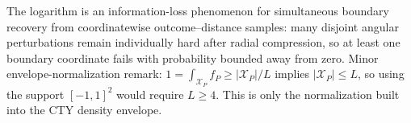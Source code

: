 The logarithm is an information-loss phenomenon for simultaneous boundary recovery from coordinatewise outcome--distance samples: many disjoint angular perturbations remain individually hard after radial compression, so at least one boundary coordinate fails with probability bounded away from zero.  Minor envelope-normalization remark: \(1=\int_{\mathcal X_P}f_P\geq|\mathcal X_P|/L\) implies \(|\mathcal X_P|\leq L\), so using the support \([-1,1]^2\) would require \(L\geq4\).  This is only the normalization built into the CTY density envelope.